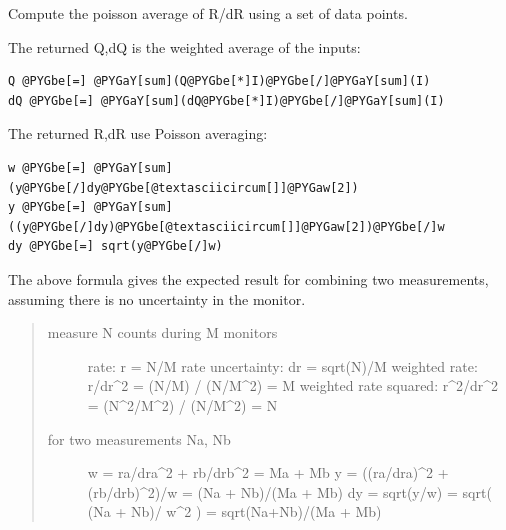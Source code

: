 \documentclass[letterpaper,10pt,english]{sphinxmanual}
\begin{document}
\begin{fulllineitems}
\label{api/stitch:refl1d.stitch.poisson_average}
Compute the poisson average of R/dR using a set of data points.

The returned Q,dQ is the weighted average of the inputs:

\begin{Verbatim}[commandchars=@\[\]]
Q @PYGbe[=] @PYGaY[sum](Q@PYGbe[*]I)@PYGbe[/]@PYGaY[sum](I)
dQ @PYGbe[=] @PYGaY[sum](dQ@PYGbe[*]I)@PYGbe[/]@PYGaY[sum](I)
\end{Verbatim}

The returned R,dR use Poisson averaging:

\begin{Verbatim}[commandchars=@\[\]]
w @PYGbe[=] @PYGaY[sum](y@PYGbe[/]dy@PYGbe[@textasciicircum[]]@PYGaw[2])
y @PYGbe[=] @PYGaY[sum]((y@PYGbe[/]dy)@PYGbe[@textasciicircum[]]@PYGaw[2])@PYGbe[/]w
dy @PYGbe[=] sqrt(y@PYGbe[/]w)
\end{Verbatim}

The above formula gives the expected result for combining two
measurements, assuming there is no uncertainty in the monitor.
\begin{quote}
\begin{description}
\item[{measure N counts during M monitors}] \leavevmode
rate:                   r = N/M
rate uncertainty:       dr = sqrt(N)/M
weighted rate:          r/dr\textasciicircum{}2 = (N/M) / (N/M\textasciicircum{}2) =  M
weighted rate squared:  r\textasciicircum{}2/dr\textasciicircum{}2 = (N\textasciicircum{}2/M\textasciicircum{}2) / (N/M\textasciicircum{}2) = N

\item[{for two measurements Na, Nb}] \leavevmode
w = ra/dra\textasciicircum{}2 + rb/drb\textasciicircum{}2 = Ma + Mb
y = ((ra/dra)\textasciicircum{}2 + (rb/drb)\textasciicircum{}2)/w = (Na + Nb)/(Ma + Mb)
dy = sqrt(y/w) = sqrt( (Na + Nb)/ w\textasciicircum{}2 ) = sqrt(Na+Nb)/(Ma + Mb)

\end{description}
\end{quote}

\end{fulllineitems}

\end{document}
